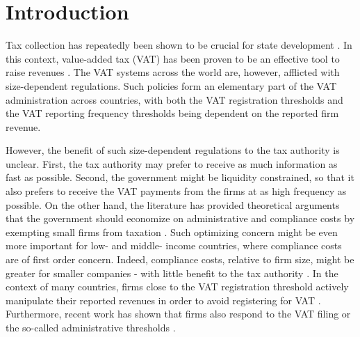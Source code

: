 \section{Introduction}
Tax collection has repeatedly been shown to be crucial for state development \citep{besley2014developing}. In this context, value-added tax (VAT) has been proven to be an effective tool to raise revenues \citep{keen2006vat}. The VAT systems across the world are, however, afflicted with size-dependent regulations. Such policies form an elementary part of the VAT administration across countries, with both the VAT registration thresholds and the VAT reporting frequency thresholds being dependent on the reported firm revenue.

However, the benefit of such size-dependent regulations to the tax authority is unclear. First, the tax authority may prefer to receive as much information as fast as possible. Second, the government might be liquidity constrained, so that it also prefers to receive the VAT payments from the firms at as high frequency as possible. On the other hand, the literature has provided theoretical arguments that the government should economize on administrative and compliance costs by exempting small firms from taxation \citep{dharmapala2011tax}. Such optimizing concern might be even more important for low- and middle- income countries, where compliance costs are of first order concern. Indeed,  compliance costs, relative to firm size, might be greater for smaller companies - with little benefit to the tax authority \citep{internationaltaxdialogue2007,internationaltaxdialogue2013}. In the context of many countries, firms close to the VAT registration threshold actively manipulate their reported revenues in order to avoid registering for VAT \citep{onji2009response,gebresilasse2016firm,liu2017vat,harju2016effects, boonzaaier2017small}. Furthermore, recent work has shown that firms also respond to the VAT filing or the so-called administrative thresholds \citep{asatryan2017responses}. 


